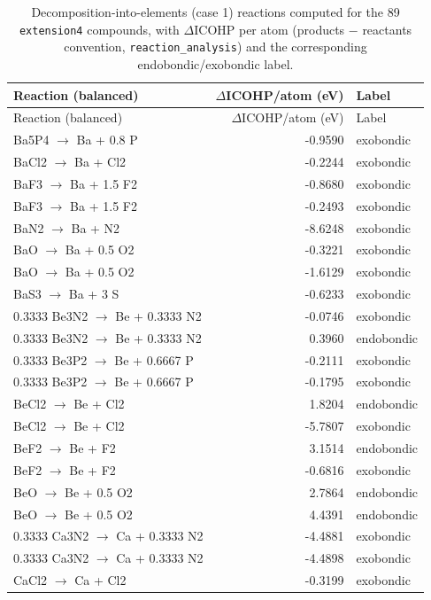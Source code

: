 \begin{longtable}{@{}lrl@{}}
\caption{Decomposition-into-elements (case 1) reactions computed for the 89 \texttt{extension4} compounds, with $\Delta$ICOHP per atom (products $-$ reactants convention, \texttt{reaction\_analysis}) and the corresponding endobondic/exobondic label.}\\
\toprule
Reaction (balanced) & $\Delta$ICOHP/atom (eV) & Label \\
\midrule
\endfirsthead
\toprule
Reaction (balanced) & $\Delta$ICOHP/atom (eV) & Label \\
\midrule
\endhead
\bottomrule
\endfoot
0.2 Ba5P4 $\rightarrow$ Ba + 0.8 P & -0.9590 & exobondic \\
BaCl2 $\rightarrow$ Ba + Cl2 & -0.2244 & exobondic \\
BaF3 $\rightarrow$ Ba + 1.5 F2 & -0.8680 & exobondic \\
BaF3 $\rightarrow$ Ba + 1.5 F2 & -0.2493 & exobondic \\
BaN2 $\rightarrow$ Ba + N2 & -8.6248 & exobondic \\
BaO $\rightarrow$ Ba + 0.5 O2 & -0.3221 & exobondic \\
BaO $\rightarrow$ Ba + 0.5 O2 & -1.6129 & exobondic \\
BaS3 $\rightarrow$ Ba + 3 S & -0.6233 & exobondic \\
0.3333 Be3N2 $\rightarrow$ Be + 0.3333 N2 & -0.0746 & exobondic \\
0.3333 Be3N2 $\rightarrow$ Be + 0.3333 N2 & 0.3960 & endobondic \\
0.3333 Be3P2 $\rightarrow$ Be + 0.6667 P & -0.2111 & exobondic \\
0.3333 Be3P2 $\rightarrow$ Be + 0.6667 P & -0.1795 & exobondic \\
BeCl2 $\rightarrow$ Be + Cl2 & 1.8204 & endobondic \\
BeCl2 $\rightarrow$ Be + Cl2 & -5.7807 & exobondic \\
BeF2 $\rightarrow$ Be + F2 & 3.1514 & endobondic \\
BeF2 $\rightarrow$ Be + F2 & -0.6816 & exobondic \\
BeO $\rightarrow$ Be + 0.5 O2 & 2.7864 & endobondic \\
BeO $\rightarrow$ Be + 0.5 O2 & 4.4391 & endobondic \\
0.3333 Ca3N2 $\rightarrow$ Ca + 0.3333 N2 & -4.4881 & exobondic \\
0.3333 Ca3N2 $\rightarrow$ Ca + 0.3333 N2 & -4.4898 & exobondic \\
CaCl2 $\rightarrow$ Ca + Cl2 & -0.3199 & exobondic \\

\end{longtable}

